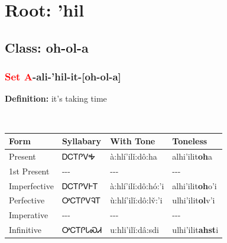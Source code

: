 \needspace{4in}
\section*{Root: 'hil}
\nopagebreak
{}
\needspace{3in}
\subsection*{Class: oh-ol-a}
\nopagebreak
\needspace{2in}
\subsubsection*{\textcolor{Red}{Set A}{-}ali{-}\textbf{'hil}{-}it{-}[oh-ol-a]}
\nopagebreak
\textbf{Definition: } it{\textquoteright}s taking time
\\[0.5em]
\begin{tabularx}{\textwidth}{l X X X}%
\toprule%
\textbf{Form}&\textbf{Syllabary}&\textbf{With Tone}&\textbf{Toneless}\\%
\midrule%
Present&ᎠᏟᎢᎵᏙᎭ&à:hlí’ilǐ:dô:ha&alhi'ilit\textbf{oh}a\\%
1st Present&{-}{-}{-}&{-}{-}{-}&{-}{-}{-}\\%
Imperfective&ᎠᏟᎢᎵᏙᎰᎢ&à:hlí’ilǐ:dô:hó:’i&alhi'ilit\textbf{oh}o'i\\%
Perfective&ᎤᏟᎢᎵᏙᎸᎢ&ù:hlí’ilǐ:dô:lv̌:’i&ulhi'ilit\textbf{ol}v'i\\%
Imperative&{-}{-}{-}&{-}{-}{-}&{-}{-}{-}\\%
Infinitive&ᎤᏟᎢᎵᏓᏍᏗ&u:hli’ilǐ:dâ:sdi&ulhi'ilit\textbf{ahst}i\\%
\bottomrule%
\end{tabularx}
\\[1em]